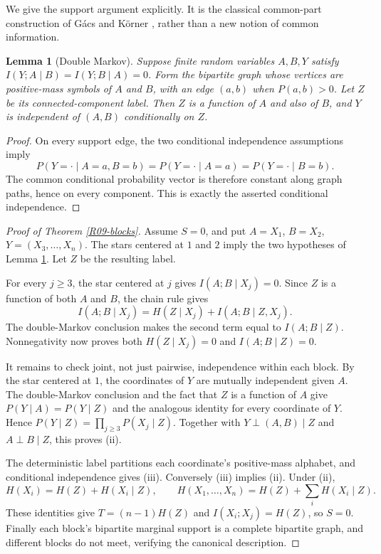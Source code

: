 \documentclass[11pt,a4paper]{article}
\newtheorem{lemma}[theorem]{Lemma}
\theoremstyle{definition}\newtheorem{definition}[theorem]{Definition}
\theoremstyle{remark}\newtheorem{remark}[theorem]{Remark}
\numberwithin{equation}{section}
\begin{document}
We give the support argument explicitly. It is the classical common-part construction of G\'acs and K\"orner \cite{ref077}, rather than a new notion of common information.

\begin{lemma}[Double Markov]\label{R09-double}
Suppose finite random variables $A,B,Y$ satisfy
$I(Y;A\mid B)=I(Y;B\mid A)=0$. Form the bipartite graph whose vertices are positive-mass symbols of $A$ and $B$, with an edge $(a,b)$ when $P(a,b)>0$. Let $Z$ be its connected-component label. Then $Z$ is a function of $A$ and also of $B$, and $Y$ is independent of $(A,B)$ conditionally on $Z$.
\end{lemma}
\begin{proof}
On every support edge, the two conditional independence assumptions imply
\[
 P(Y=\cdot\mid A=a,B=b)=P(Y=\cdot\mid A=a)=P(Y=\cdot\mid B=b).
\]
The common conditional probability vector is therefore constant along graph paths, hence on every component. This is exactly the asserted conditional independence.
\end{proof}

\begin{proof}[Proof of Theorem \ref{R09-blocks}]
Assume $S=0$, and put $A=X_1$, $B=X_2$, $Y=(X_3,\ldots,X_n)$. The stars centered at $1$ and $2$ imply the two hypotheses of Lemma \ref{R09-double}. Let $Z$ be the resulting label.

For every $j\ge3$, the star centered at $j$ gives $I(A;B\mid X_j)=0$. Since $Z$ is a function of both $A$ and $B$, the chain rule gives
\begin{equation}\label{R09-commonidentity}
 I(A;B\mid X_j)=H(Z\mid X_j)+I(A;B\mid Z,X_j).
\end{equation}
The double-Markov conclusion makes the second term equal to $I(A;B\mid Z)$. Nonnegativity now proves both $H(Z\mid X_j)=0$ and $I(A;B\mid Z)=0$.

It remains to check joint, not just pairwise, independence within each block. By the star centered at $1$, the coordinates of $Y$ are mutually independent given $A$. The double-Markov conclusion and the fact that $Z$ is a function of $A$ give $P(Y\mid A)=P(Y\mid Z)$ and the analogous identity for every coordinate of $Y$. Hence $P(Y\mid Z)=\prod_{j\ge3}P(X_j\mid Z)$. Together with $Y\perp(A,B)\mid Z$ and $A\perp B\mid Z$, this proves (ii).

The deterministic label partitions each coordinate's positive-mass alphabet, and conditional independence gives (iii). Conversely (iii) implies (ii). Under (ii),
\[
 H(X_i)=H(Z)+H(X_i\mid Z),\qquad
 H(X_1,\ldots,X_n)=H(Z)+\sum_iH(X_i\mid Z).
\]
These identities give $T=(n-1)H(Z)$ and $I(X_i;X_j)=H(Z)$, so $S=0$. Finally each block's bipartite marginal support is a complete bipartite graph, and different blocks do not meet, verifying the canonical description.
\end{proof}
\end{document}
